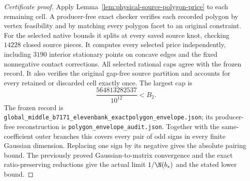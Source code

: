 \begin{proof}[Certificate proof]
Apply Lemma~\ref{lem:physical-source-polygon-price} to each remaining
cell. A producer-free exact checker verifies each recorded polygon by
vertex feasibility and by matching every polygon facet to an original
constraint. For the selected native bounds it splits at every saved
source knot, checking $14228$ closed source pieces. It computes every
selected price independently, including $3190$ interior stationary
points on concave edges and the fixed nonnegative contact corrections.
All selected rational caps agree with the frozen record. It also
verifies the original gap-free source partition and accounts for every
retained or discarded cell exactly once. The largest cap is
\[
 \frac{564813282537}{10^{12}}< B_2.
\]
The frozen record is
\texttt{global\_\allowbreak middle\_\allowbreak b7171\_\allowbreak elevenbank\_\allowbreak exactpolygon\_\allowbreak envelope.json};
its producer-free reconstruction is
\texttt{polygon\_\allowbreak envelope\_\allowbreak audit.json}.
Together with the same-coefficient outer branches this covers every
pair of odd signs in every finite Gaussian dimension. Replacing one
sign by its negative gives the absolute pairing bound. The previously
proved Gaussian-to-matrix convergence and the exact ratio-preserving
reductions give the actual limit $1/\N(b_*)$ and the stated lower bound.
\end{proof}
